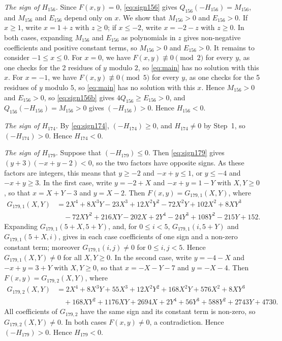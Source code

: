 \documentclass[11pt]{article}
\begin{document}
\emph{The sign of $H_{156}$.} Since $F(x,y)=0$, \eqref{eq:sign156} gives $Q_{156}(-H_{156})=M_{156}$, and $M_{156}$ and $E_{156}$ depend only on $x$. We show that $M_{156}>0$ and $E_{156}>0$. If $x\geq1$, write $x=1+z$ with $z\geq0$; if $x\leq-2$, write $x=-2-z$ with $z\geq0$. In both cases, expanding $M_{156}$ and $E_{156}$ as polynomials in $z$ gives non-negative coefficients and positive constant terms, so $M_{156}>0$ and $E_{156}>0$. It remains to consider $-1\leq x\leq0$. For $x=0$, we have $F(x,y)\not\equiv0\pmod{2}$ for every $y$, as one checks for the 2 residues of $y$ modulo $2$, so \eqref{eq:main} has no solution with this $x$. For $x=-1$, we have $F(x,y)\not\equiv0\pmod{5}$ for every $y$, as one checks for the 5 residues of $y$ modulo $5$, so \eqref{eq:main} has no solution with this $x$. Hence $M_{156}>0$ and $E_{156}>0$, so \eqref{eq:sign156b} gives $4Q_{156}\geq E_{156}>0$, and $Q_{156}(-H_{156})=M_{156}>0$ gives $(-H_{156})>0$. Hence $H_{156}<0$.

\emph{The sign of $H_{174}$.} By \eqref{eq:sign174}, $(-H_{174})\geq0$, and $H_{174}\neq0$ by Step~1, so $(-H_{174})>0$. Hence $H_{174}<0$.

\emph{The sign of $H_{179}$.} Suppose that $(-H_{179})\leq0$. Then \eqref{eq:sign179} gives $(y+3)(-x+y-2)<0$, so the two factors have opposite signs. As these factors are integers, this means that $y\geq-2$ and $-x+y\leq1$, or $y\leq-4$ and $-x+y\geq3$. In the first case, write $y=-2+X$ and $-x+y=1-Y$ with $X,Y\geq0$, so that $x=X+Y-3$ and $y=X-2$. Then $F(x,y)=G_{179,1}(X,Y)$, where
\begin{align*}
G_{179,1}(X,Y)&=2X^{4}+8X^{3}Y-23X^{3}+12X^{2}Y^{2}-72X^{2}Y+102X^{2}+8XY^{3}\\
&\quad-72XY^{2}+216XY-202X+2Y^{4}-24Y^{3}+108Y^{2}-215Y+152.
\end{align*}
Expanding $G_{179,1}(5+X,5+Y)$, and, for $0\leq i<5$, $G_{179,1}(i,5+Y)$ and $G_{179,1}(5+X,i)$, gives in each case coefficients of one sign and a non-zero constant term; moreover $G_{179,1}(i,j)\neq0$ for $0\leq i,j<5$. Hence $G_{179,1}(X,Y)\neq0$ for all $X,Y\geq0$. In the second case, write $y=-4-X$ and $-x+y=3+Y$ with $X,Y\geq0$, so that $x=-X-Y-7$ and $y=-X-4$. Then $F(x,y)=G_{179,2}(X,Y)$, where
\begin{align*}
G_{179,2}(X,Y)&=2X^{4}+8X^{3}Y+55X^{3}+12X^{2}Y^{2}+168X^{2}Y+576X^{2}+8XY^{3}\\
&\quad+168XY^{2}+1176XY+2694X+2Y^{4}+56Y^{3}+588Y^{2}+2743Y+4730.
\end{align*}
All coefficients of $G_{179,2}$ have the same sign and its constant term is non-zero, so $G_{179,2}(X,Y)\neq0$. In both cases $F(x,y)\neq0$, a contradiction. Hence $(-H_{179})>0$. Hence $H_{179}<0$.
\end{document}
